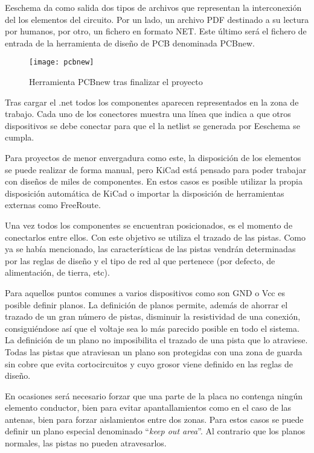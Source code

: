 Eeschema da como salida dos tipos de archivos que representan la interconexión del los elementos del circuito. Por un lado, un archivo PDF destinado a su lectura por humanos, por otro, un fichero en formato NET. Este último será el fichero de entrada de la herramienta de diseño de PCB denominada PCBnew. 

\begin{figure} [h]
    \centering
    \texttt{[image: pcbnew]}
    \caption{Herramienta PCBnew tras finalizar el proyecto}
    \label{fig:pcbnew_1}
\end{figure}

Tras cargar el .net todos los componentes aparecen representados en la zona de trabajo. Cada uno de los conectores muestra una línea que indica a que otros dispositivos se debe conectar para que el la netlist se generada por Eeschema se cumpla.

Para proyectos de menor envergadura como este, la disposición de los elementos se puede realizar de forma manual, pero KiCad está pensado para poder trabajar con diseños de miles de componentes. En estos casos es posible utilizar la propia disposición automática de KiCad o importar la disposición de herramientas externas como FreeRoute.

Una vez todos los componentes se encuentran posicionados, es el momento de conectarlos entre ellos. Con este objetivo se utiliza el trazado de las pistas. Como ya se había mencionado, las características de las pistas vendrán determinadas por las reglas de diseño y el tipo de red al que pertenece (por defecto, de alimentación, de tierra, etc).

Para aquellos puntos comunes a varios dispositivos como son GND o Vcc es posible definir planos. La definición de planos permite, además de ahorrar el trazado de un gran número de pistas, disminuir la resistividad de una conexión, consiguiéndose así que el voltaje sea lo más parecido posible en todo el sistema.
\\La definición de un plano no imposibilita el trazado de una pista que lo atraviese. Todas las pistas que atraviesan un plano son protegidas con una zona de guarda sin cobre que evita cortocircuitos y cuyo grosor viene definido en las reglas de diseño.

En ocasiones será necesario forzar que una parte de la placa no contenga ningún elemento conductor, bien para evitar apantallamientos como en el caso de las antenas, bien para forzar aislamientos entre dos zonas. Para estos casos se puede definir un plano especial denominado ``\textit{keep out area}''. Al contrario que los planos normales, las pistas no pueden atravesarlos.

